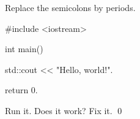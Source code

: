 Replace the semicolons by periods.
\begin{console}
#include <iostream>

int main()
{
    std::cout << "Hello, world!\n".

    return 0.
}
\end{console}
Run it. Does it work? Fix it.
\qed
